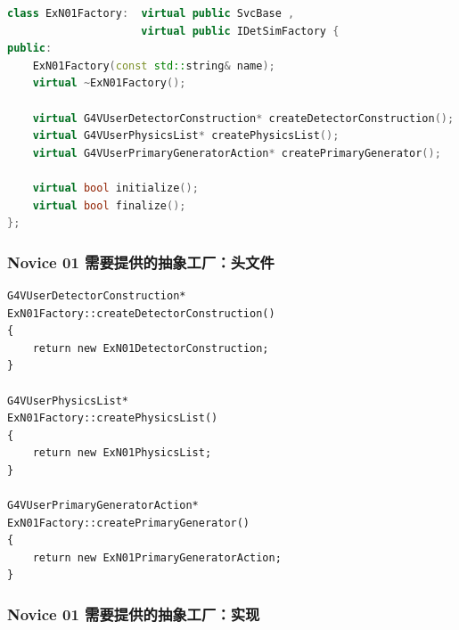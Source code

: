 \newsavebox{\NoviceHeader}
\begin{lrbox}{\NoviceHeader}
\begin{lstlisting}[language=c++]
class ExN01Factory:  virtual public SvcBase , 
                     virtual public IDetSimFactory {
public:
    ExN01Factory(const std::string& name);
    virtual ~ExN01Factory();

    virtual G4VUserDetectorConstruction* createDetectorConstruction();
    virtual G4VUserPhysicsList* createPhysicsList();
    virtual G4VUserPrimaryGeneratorAction* createPrimaryGenerator();

    virtual bool initialize();
    virtual bool finalize();
};
\end{lstlisting}
\end{lrbox}

\begin{frame}
    \frametitle{Novice 01 需要提供的抽象工厂：头文件}
    \par\usebox{\NoviceHeader}
\end{frame}

\newsavebox{\NoviceImpl}
\begin{lrbox}{\NoviceImpl}
\begin{lstlisting}
G4VUserDetectorConstruction*
ExN01Factory::createDetectorConstruction()
{   
    return new ExN01DetectorConstruction;
}

G4VUserPhysicsList*
ExN01Factory::createPhysicsList()
{   
    return new ExN01PhysicsList;
}

G4VUserPrimaryGeneratorAction*
ExN01Factory::createPrimaryGenerator()
{   
    return new ExN01PrimaryGeneratorAction;
}
\end{lstlisting}
\end{lrbox}

\begin{frame}
    \frametitle{Novice 01 需要提供的抽象工厂：实现}
    \par\usebox{\NoviceImpl}
\end{frame}

